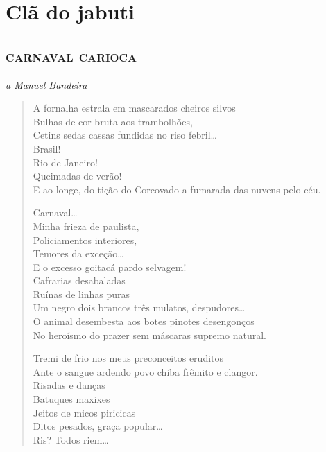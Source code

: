 \part{Clã do jabuti}

\chapter[Carnaval carioca]{\textsc{carnaval carioca} }

\hfill\emph{a Manuel Bandeira}

\begin{verse}
A fornalha estrala em mascarados cheiros silvos\\
Bulhas de cor bruta aos trambolhões,\\
Cetins sedas cassas fundidas no riso febril\ldots{}\\
Brasil!\\
Rio de Janeiro!\\
Queimadas de verão!\\
E ao longe, do tição do Corcovado a fumarada das nuvens pelo céu.

Carnaval\ldots{}\\
Minha frieza de paulista,\\
Policiamentos interiores,\\
Temores da exceção\ldots{}\\
E o excesso goitacá pardo selvagem!\\
Cafrarias desabaladas\\
Ruínas de linhas puras\\
Um negro dois brancos três mulatos, despudores\ldots{}\\
O animal desembesta aos botes pinotes desengonços\\
No heroísmo do prazer sem máscaras supremo natural.

Tremi de frio nos meus preconceitos eruditos\\
Ante o sangue ardendo povo chiba frêmito e clangor.\\
Risadas e danças\\
Batuques maxixes\\
Jeitos de micos piricicas\\
Ditos pesados, graça popular\ldots{}\\
Ris? Todos riem\ldots{}


\end{verse}
